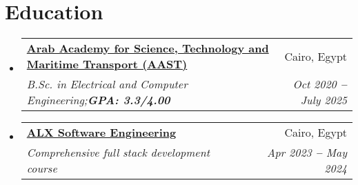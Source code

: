 \documentclass[letterpaper,10.5pt]{article}
\makeatletter
\newcommand{\resumeSubheading}[4]{
  \vspace{-2pt}\item
    \begin{tabular*}{0.97\textwidth}[t]{l@{\extracolsep{\fill}}r}
      \textbf{#1} & #2 \\
      \textit{\small#3} & \textit{\small #4} \\
    \end{tabular*}\vspace{-7pt}
}
\newcommand{\resumeEducationHeading}[6]{
  \vspace{-2pt}\item
    \begin{tabular*}{0.97\textwidth}[t]{l@{\extracolsep{\fill}}r}
      \textbf{#1} & #2 \\
      \textit{\small#3} & \textit{\small #4} \\
      \textit{\small#5} & \textit{\small #6} \\
    \end{tabular*}\vspace{-5pt}
}
\newcommand{\resumeSubHeadingListStart}{\begin{itemize}[leftmargin=0.15in, label={}]}
\newcommand{\resumeSubHeadingListEnd}{\end{itemize}}
\makeatother
\begin{document}


\section{Education}
  \resumeSubHeadingListStart
    
    \resumeSubheading
      {\href{https://aast.edu/en/index.php?from=edurank.org}{Arab Academy for Science, Technology and Maritime Transport (AAST)}}{Cairo, Egypt}
      {B.Sc. in Electrical and Computer Engineering;\textbf{GPA: 3.3/4.00}}{Oct 2020 \textbf{--} July 2025}
      
    \resumeSubheading
    {\href{https://tech.alxafrica.com/hubfs/ALX-Software-Engineering-Curriculum.pdf?hsLang=en}{ALX Software Engineering}}{Cairo, Egypt}
    {Comprehensive full stack development course}{Apr 2023 \textbf{--} May 2024}

    
  \resumeSubHeadingListEnd



\end{document}
